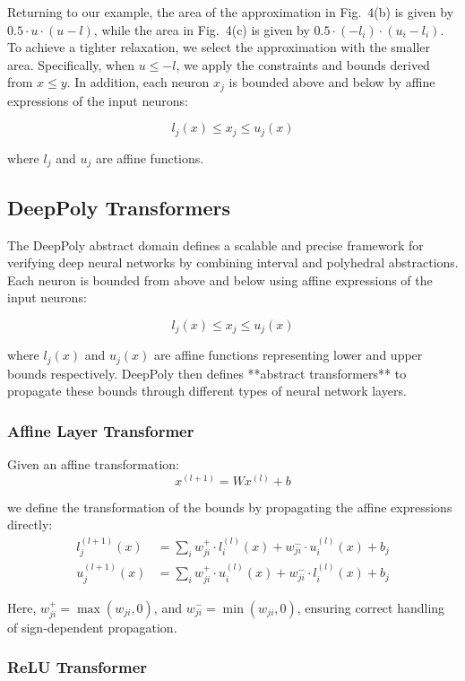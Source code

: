 \documentclass[oneside,11pt,dvipsnames]{book}
\numberwithin{equation}{section}
\theoremstyle{definition}
\theoremstyle{remark}
\begin{document}
Returning to our example, the area of the approximation in Fig.~4(b) is given by \( 0.5 \cdot u \cdot (u - l) \), while the area in Fig.~4(c) is given by \( 0.5 \cdot (-l_i) \cdot (u_i - l_i) \). To achieve a tighter relaxation, we select the approximation with the smaller area. Specifically, when \( u \leq -l \), we apply the constraints and bounds derived from \(x \leq y\).
In addition, each neuron \(x_j\) is bounded above and below by affine expressions of the input neurons:

\[
l_j(x) \leq x_j \leq u_j(x)
\]

where \(l_j\) and \(u_j\) are affine functions.

\subsection{DeepPoly Transformers}

The DeepPoly abstract domain defines a scalable and precise framework for verifying deep neural networks by combining interval and polyhedral abstractions. Each neuron is bounded from above and below using affine expressions of the input neurons:

\[
l_j(x) \leq x_j \leq u_j(x)
\]

where \(l_j(x)\) and \(u_j(x)\) are affine functions representing lower and upper bounds respectively. DeepPoly then defines **abstract transformers** to propagate these bounds through different types of neural network layers.

\subsubsection{Affine Layer Transformer}

Given an affine transformation:
\[
x^{(l+1)} = W x^{(l)} + b
\]

we define the transformation of the bounds by propagating the affine expressions directly:
\begin{align*}
l_j^{(l+1)}(x) &= \sum_i w_{ji}^+ \cdot l_i^{(l)}(x) + w_{ji}^- \cdot u_i^{(l)}(x) + b_j \\
u_j^{(l+1)}(x) &= \sum_i w_{ji}^+ \cdot u_i^{(l)}(x) + w_{ji}^- \cdot l_i^{(l)}(x) + b_j
\end{align*}

Here, \(w^+_{ji} = \max(w_{ji}, 0)\), and \(w^-_{ji} = \min(w_{ji}, 0)\), ensuring correct handling of sign-dependent propagation.

\subsubsection{ReLU Transformer}
\end{document}
